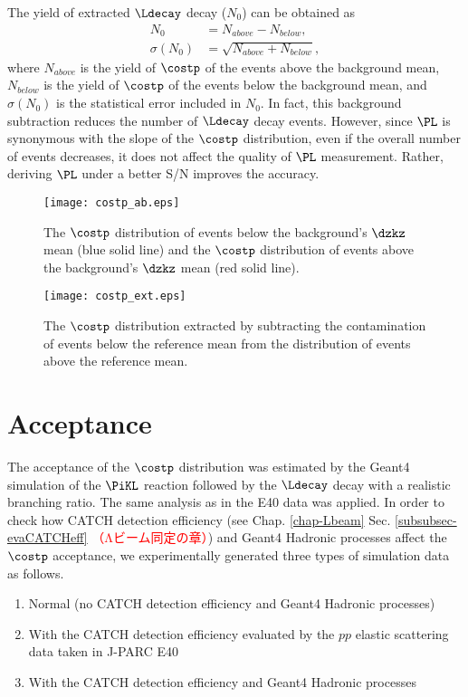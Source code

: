 The yield of extracted $\Ldecay$ decay ($N_0$) can be obtained as
\begin{align}
  N_0 &= N_{above} - N_{below}, \\
  \sigma(N_0) &= \sqrt{N_{above} + N_{below}},
\end{align}
where $N_{above}$ is the yield of $\costp$ of the events above the background mean, $N_{below}$ is the yield of $\costp$ of the events below the background mean, and $\sigma(N_0)$ is the statistical error included in $N_0$. In fact, this background subtraction reduces the number of $\Ldecay$ decay events. However, since $\PL$ is synonymous with the slope of the $\costp$ distribution, even if the overall number of events decreases, it does not affect the quality of $\PL$ measurement. Rather, deriving $\PL$ under a better S/N improves the accuracy.

\begin{figure}[h]
  \centering
  \texttt{[image: costp\_ab.eps]}
  \caption{The $\costp$ distribution of events below the background's $\dzkz$ mean (blue solid line) and the $\costp$ distribution of events above the background's $\dzkz$ mean (red solid line).}
  \label{fig-costp_ab}
\end{figure}

\begin{figure}[h]
  \centering
  \texttt{[image: costp\_ext.eps]}
  \caption{The $\costp$ distribution extracted by subtracting the contamination of events below the reference mean from the distribution of events above the reference mean.}
  \label{fig-costp_ext}
\end{figure}


\clearpage
\section{Acceptance}
\label{sec-accPl}

The acceptance of the $\costp$ distribution was estimated by the Geant4 simulation of the $\PiKL$ reaction followed by the $\Ldecay$ decay with a realistic branching ratio. The same analysis as in the E40 data was applied. In order to check how CATCH detection efficiency (see Chap. \ref{chap-Lbeam} Sec. \ref{subsubsec-evaCATCHeff} \textcolor{red}{（Λビーム同定の章）}) and Geant4 Hadronic processes affect the $\costp$ acceptance, we experimentally generated three types of simulation data as follows.
\begin{enumerate}
  \item Normal (no CATCH detection efficiency and Geant4 Hadronic processes)
  \item With the CATCH detection efficiency evaluated by the $pp$ elastic scattering data taken in J-PARC E40
  \item With the CATCH detection efficiency and Geant4 Hadronic processes
  \label{list-threetypes}
\end{enumerate}

